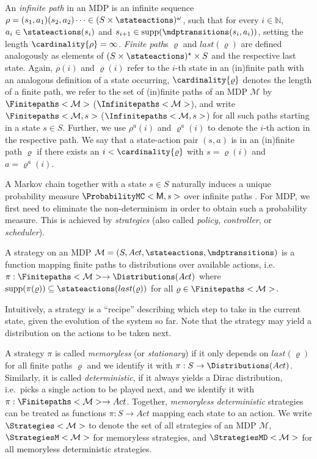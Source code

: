 \documentclass{theoretics}
\newcommand{\Naturals}{\mathbb{N}}
\newcommand{\MC}{\mathsf{M}}
\newcommand{\MDP}{\mathcal{M}}
\newcommand{\States}{S}
\newcommand{\Actions}{Act}
\newcommand{\infinitepath}{\rho}
\newcommand{\finitepath}{\varrho}
\newcommand{\strategy}{\pi}
\newcommand{\last}[1]{last(#1)}
\DeclareMathOperator{\support}{supp}
\begin{document}
An \emph{infinite path} in an MDP is an infinite sequence $\infinitepath = (s_1, a_1) (s_2, a_2) \cdots \in (\States \times \stateactions)^\omega$, such that for every $i \in \Naturals$, $a_i \in \stateactions(s_i)$ and $s_{i+1} \in \support(\mdptransitions(s_i, a_i))$, setting the length $\cardinality{\infinitepath} = \infty$.
\emph{Finite path}s $\finitepath$ and $\last{\finitepath}$ are defined analogously as elements of $(\States \times \stateactions)^\star \times \States$ and the respective last state.
Again, $\infinitepath(i)$ and $\finitepath(i)$ refer to the $i$-th state in an (in)finite path with an analogous definition of a state occurring, $\cardinality{\finitepath}$ denotes the length of a finite path, we refer to the set of (in)finite paths of an MDP $\MDP$ by $\Finitepaths<\MDP>$ ($\Infinitepaths<\MDP>$), and write $\Finitepaths<\MDP, s>$ ($\Infinitepaths<\MDP, s>$) for all such paths starting in a state $s \in \States$.
Further, we use $\infinitepath^a(i)$ and $\finitepath^a(i)$ to denote the $i$-th action in the respective path.
We say that a state-action pair $(s,a)$ is in an (in)finite path $\finitepath$ if there exists an $i < \cardinality{\finitepath}$ with $s = \finitepath(i)$ and $a = \finitepath^a(i)$.

A Markov chain together with a state $s \in \States$ naturally induces a unique probability measure $\ProbabilityMC<\MC, s>$ over infinite paths \cite[Chapter~10]{DBLP:books/daglib/0020348}.
For MDP, we first need to eliminate the non-determinism in order to obtain such a probability measure.
This is achieved by \emph{strategies} (also called \emph{policy}, \emph{controller}, or \emph{scheduler}).

\begin{definition}
	A strategy on an MDP $\MDP = (\States, \Actions, \stateactions, \mdptransitions)$ is a function mapping finite paths to distributions over available actions, i.e.\ $\strategy : \Finitepaths<\MDP> \to \Distributions(\Actions)$ where $\support(\strategy(\finitepath)) \subseteq \stateactions(\last{\finitepath})$ for all $\finitepath \in \Finitepaths<\MDP>$.
\end{definition}
Intuitively, a strategy is a \enquote{recipe} describing which step to take in the current state, given the evolution of the system so far.
Note that the strategy may yield a distribution on the actions to be taken next.

A strategy $\strategy$ is called \emph{memoryless} (or \emph{stationary}) if it only depends on $\last{\finitepath}$ for all finite paths $\finitepath$ and we identify it with $\strategy : \States \to \Distributions(\Actions)$.
Similarly, it is called \emph{deterministic}, if it always yields a Dirac distribution, i.e.\ picks a single action to be played next, and we identify it with $\strategy : \Finitepaths<\MDP> \to \Actions$.
Together, \emph{memoryless deterministic} strategies can be treated as functions $\strategy : \States \to \Actions$ mapping each state to an action.
We write $\Strategies<\MDP>$ to denote the set of all strategies of an MDP $\MDP$, $\StrategiesM<\MDP>$ for memoryless strategies, and $\StrategiesMD<\MDP>$ for all memoryless deterministic strategies.
\end{document}
